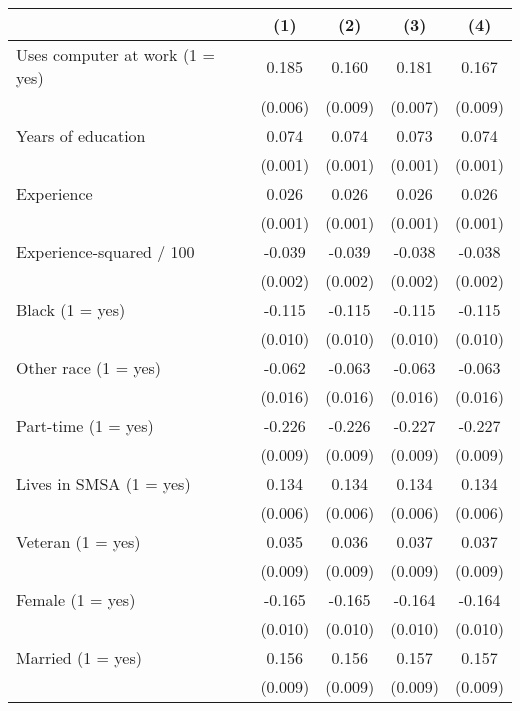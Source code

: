 \begin{tabular}{l*{4}{c}}
\hline\hline
            &\multicolumn{1}{c}{(1)}&\multicolumn{1}{c}{(2)}&\multicolumn{1}{c}{(3)}&\multicolumn{1}{c}{(4)}\\
\hline
Uses computer at work (1 = yes)&       0.185&       0.160&       0.181&       0.167\\
            &     (0.006)&     (0.009)&     (0.007)&     (0.009)\\
Years of education&       0.074&       0.074&       0.073&       0.074\\
            &     (0.001)&     (0.001)&     (0.001)&     (0.001)\\
Experience  &       0.026&       0.026&       0.026&       0.026\\
            &     (0.001)&     (0.001)&     (0.001)&     (0.001)\\
Experience-squared / 100&      -0.039&      -0.039&      -0.038&      -0.038\\
            &     (0.002)&     (0.002)&     (0.002)&     (0.002)\\
Black (1 = yes)&      -0.115&      -0.115&      -0.115&      -0.115\\
            &     (0.010)&     (0.010)&     (0.010)&     (0.010)\\
Other race (1 = yes)&      -0.062&      -0.063&      -0.063&      -0.063\\
            &     (0.016)&     (0.016)&     (0.016)&     (0.016)\\
Part-time (1 = yes)&      -0.226&      -0.226&      -0.227&      -0.227\\
            &     (0.009)&     (0.009)&     (0.009)&     (0.009)\\
Lives in SMSA (1 = yes)&       0.134&       0.134&       0.134&       0.134\\
            &     (0.006)&     (0.006)&     (0.006)&     (0.006)\\
Veteran (1 = yes)&       0.035&       0.036&       0.037&       0.037\\
            &     (0.009)&     (0.009)&     (0.009)&     (0.009)\\
Female (1 = yes)&      -0.165&      -0.165&      -0.164&      -0.164\\
            &     (0.010)&     (0.010)&     (0.010)&     (0.010)\\
Married (1 = yes)&       0.156&       0.156&       0.157&       0.157\\
            &     (0.009)&     (0.009)&     (0.009)&     (0.009)\\

\end{tabular}
